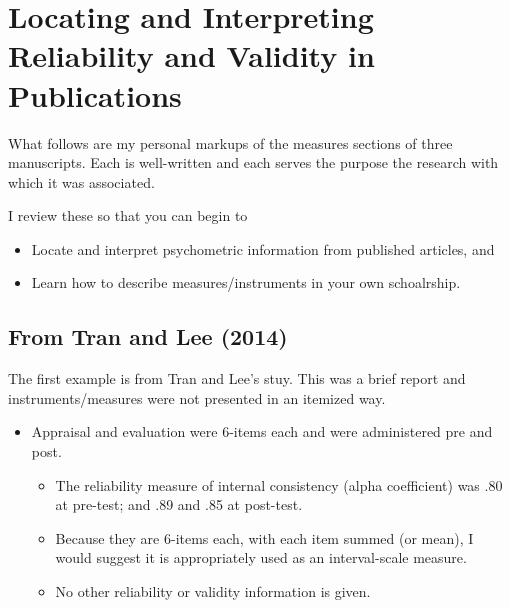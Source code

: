 \documentclass[
  english,
]{book}
\providecommand{\tightlist}{%
  \setlength{\itemsep}{0pt}\setlength{\parskip}{0pt}}
\begin{document}
\hypertarget{locating-and-interpreting-reliability-and-validity-in-publications}{%
\section{Locating and Interpreting Reliability and Validity in Publications}\label{locating-and-interpreting-reliability-and-validity-in-publications}}

What follows are my personal markups of the measures sections of three manuscripts. Each is well-written and each serves the purpose the research with which it was associated.

I review these so that you can begin to

\begin{itemize}
\tightlist
\item
  Locate and interpret psychometric information from published articles, and
\item
  Learn how to describe measures/instruments in your own schoalrship.
\end{itemize}

\hypertarget{from-tran-and-lee-2014}{%
\subsection{From Tran and Lee (2014)}\label{from-tran-and-lee-2014}}

The first example is from Tran and Lee's \citeyearpar{tran_you_2014} stuy. This was a brief report and instruments/measures were not presented in an itemized way.

\begin{itemize}
\tightlist
\item
  Appraisal and evaluation were 6-items each and were administered pre and post.

  \begin{itemize}
  \tightlist
  \item
    The reliability measure of internal consistency (alpha coefficient) was .80 at pre-test; and .89 and .85 at post-test.
  \item
    Because they are 6-items each, with each item summed (or mean), I would suggest it is appropriately used as an interval-scale measure.
  \item
    No other reliability or validity information is given.
  \end{itemize}
\end{itemize}
\end{document}
